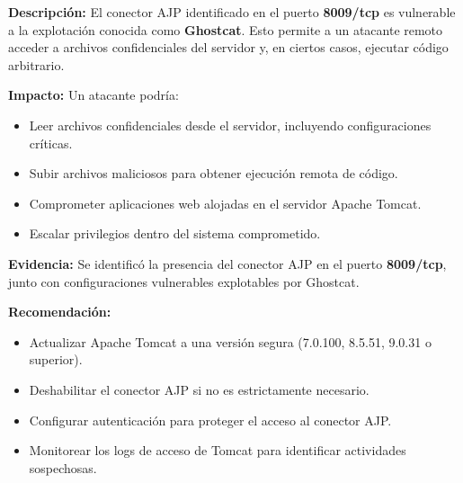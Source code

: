 \documentclass[11pt,oneside,a4paper]{book}
\begin{document}
\textbf{Descripción:}  
El conector AJP identificado en el puerto \textbf{8009/tcp} es vulnerable a la explotación conocida como \textbf{Ghostcat}. Esto permite a un atacante remoto acceder a archivos confidenciales del servidor y, en ciertos casos, ejecutar código arbitrario.

\textbf{Impacto:}  
Un atacante podría:
\begin{itemize}
    \item Leer archivos confidenciales desde el servidor, incluyendo configuraciones críticas.
    \item Subir archivos maliciosos para obtener ejecución remota de código.
    \item Comprometer aplicaciones web alojadas en el servidor Apache Tomcat.
    \item Escalar privilegios dentro del sistema comprometido.
\end{itemize}

\textbf{Evidencia:}  
Se identificó la presencia del conector AJP en el puerto \textbf{8009/tcp}, junto con configuraciones vulnerables explotables por Ghostcat.

\textbf{Recomendación:}  
\begin{itemize}
    \item Actualizar Apache Tomcat a una versión segura (7.0.100, 8.5.51, 9.0.31 o superior).
    \item Deshabilitar el conector AJP si no es estrictamente necesario.
    \item Configurar autenticación para proteger el acceso al conector AJP.
    \item Monitorear los logs de acceso de Tomcat para identificar actividades sospechosas.
\end{itemize}
\end{document}
